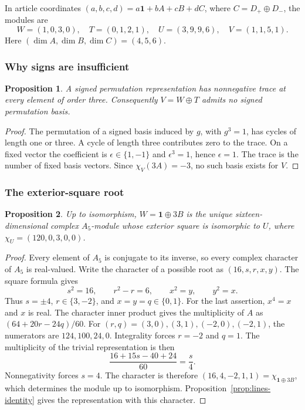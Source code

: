 \documentclass[11pt,a4paper]{article}
\newtheorem{proposition}{Proposition}[section]
\begin{document}
In article coordinates $(a,b,c,d)=a\mathbf1+bA+cB+dC$, where
$C=D_+\oplus D_-$, the modules are
\[
W=(1,0,3,0),\quad T=(0,1,2,1),\quad
U=(3,9,9,6),\quad V=(1,1,5,1).
\]
Here $(\dim A,\dim B,\dim C)=(4,5,6)$.

\subsubsection*{Why signs are insufficient}

\begin{proposition}\label{prop:lines-signs}
A signed permutation representation has nonnegative trace at every
element of order three. Consequently $V=W\oplus T$ admits no signed
permutation basis.
\end{proposition}

\begin{proof}
The permutation of a signed basis induced by $g$, with $g^3=1$, has
cycles of length one or three. A cycle of length three contributes
zero to the trace. On a fixed vector the coefficient is
$\epsilon\in\{1,-1\}$ and $\epsilon^3=1$, hence $\epsilon=1$.
The trace is the number of fixed basis vectors. Since $\chi_V(3A)=-3$,
no such basis exists for $V$.
\end{proof}

\subsubsection*{The exterior-square root}

\begin{proposition}\label{prop:lines-root}
Up to isomorphism, $W=\mathbf1\oplus3B$ is the unique
sixteen-dimensional complex $A_5$-module whose exterior square is isomorphic to $U$, where $\chi_U=(120,0,3,0,0)$.
\end{proposition}

\begin{proof}
Every element of $A_5$ is conjugate to its inverse, so every complex
character of $A_5$ is real-valued. Write the character of a possible
root as $(16,s,r,x,y)$. The square formula gives
\[
s^2=16,\qquad r^2-r=6,\qquad x^2=y,\qquad y^2=x.
\]
Thus $s=\pm4$, $r\in\{3,-2\}$, and $x=y=q\in\{0,1\}$.
For the last assertion, $x^4=x$ and $x$ is real.
The character inner product gives the multiplicity of $A$ as
$(64+20r-24q)/60$.
For $(r,q)=(3,0),(3,1),(-2,0),(-2,1)$, the numerators are
$124,100,24,0$. Integrality forces $r=-2$ and $q=1$.
The multiplicity of the trivial representation is then
\[
\frac{16+15s-40+24}{60}=\frac{s}{4}.
\]
Nonnegativity forces $s=4$. The character is therefore
$(16,4,-2,1,1)=\chi_{\mathbf1\oplus3B}$, which determines the
module up to isomorphism. Proposition~\ref{prop:lines-identity} gives the representation with this character.
\end{proof}
\end{document}
